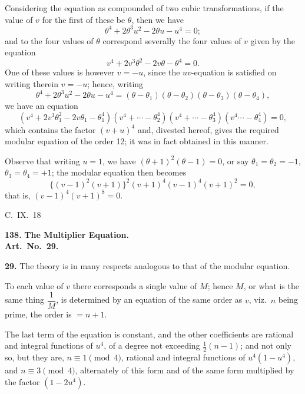 \documentclass[11pt,a4paper]{book}
\begin{document}
Considering the equation as compounded of two cubic transformations, if the value of $v$ for the first of these be $\theta$, then we have
\[
\theta^4 + 2\theta^3u^2 - 2\theta u - u^4 = 0;
\]
and to the four values of $\theta$ correspond severally the four values of $v$ given by the equation
\[
v^4 + 2v^3\theta^2 - 2v\theta - \theta^4 = 0.
\]
One of these values is however $v = -u$, since the $uv$-equation is satisfied on writing therein $v = -u$; hence, writing
\[
\theta^4 + 2\theta^3u^2 - 2\theta u - u^4 = (\theta - \theta_1)(\theta - \theta_2)(\theta - \theta_3)(\theta - \theta_4),
\]
we have an equation
\[
(v^4 + 2v^3\theta_1^2 - 2v\theta_1 - \theta_1^4)(v^4 + \cdots - \theta_2^4)(v^4 + \cdots - \theta_3^4)(v^4 \cdots - \theta_4^4) = 0,
\]
which contains the factor $(v + u)^4$ and, divested hereof, gives the required modular equation of the order 12; it was in fact obtained in this manner.

Observe that writing $u = 1$, we have $(\theta + 1)^2(\theta - 1) = 0$, or say $\theta_1 = \theta_2 = -1$, $\theta_3 = \theta_4 = +1$; the modular equation then becomes
\[
\{(v - 1)^2(v + 1)\}^2(v + 1)^4(v - 1)^4(v + 1)^2 = 0,
\]
that is, $(v - 1)^4(v + 1)^8 = 0$.

\begin{flushright}
C.~IX.~18
\end{flushright}


\noindent\textbf{138.} \textbf{The Multiplier Equation.}\\
\textbf{Art.~No.~29.}

\medskip
\noindent\textbf{29.} The theory is in many respects analogous to that of the modular equation.

To each value of $v$ there corresponds a single value of $M$; hence $M$, or what is the same thing $\dfrac{1}{M}$, is determined by an equation of the same order as $v$, viz.\ $n$ being prime, the order is $= n + 1$.

The last term of the equation is constant, and the other coefficients are rational and integral functions of $u^4$, of a degree not exceeding $\frac{1}{2}(n - 1)$; and not only so, but they are, $n \equiv 1 \pmod{4}$, rational and integral functions of $u^4(1 - u^4)$, and $n \equiv 3 \pmod{4}$, alternately of this form and of the same form multiplied by the factor $(1 - 2u^4)$.
\end{document}
